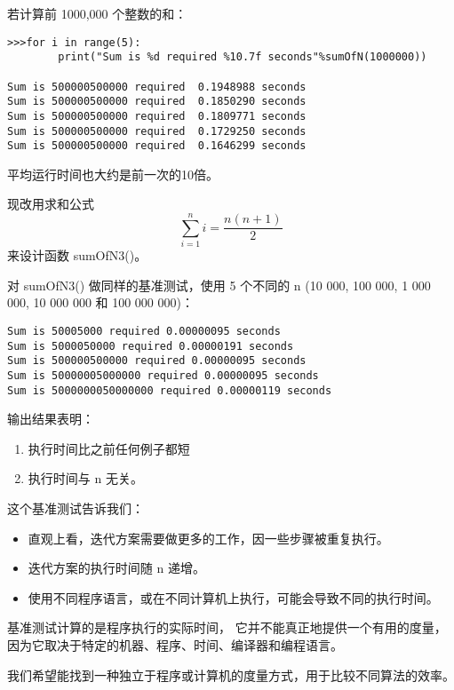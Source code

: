 \begin{frame}[fragile]
若计算前 1000,000 个整数的和：
\begin{lstlisting}
>>>for i in range(5):
        print("Sum is %d required %10.7f seconds"%sumOfN(1000000))

Sum is 500000500000 required  0.1948988 seconds
Sum is 500000500000 required  0.1850290 seconds
Sum is 500000500000 required  0.1809771 seconds
Sum is 500000500000 required  0.1729250 seconds
Sum is 500000500000 required  0.1646299 seconds
\end{lstlisting}
平均运行时间也大约是前一次的10倍。
\end{frame}


\begin{frame}[fragile]
现改用求和公式
$$
\sum_{i=1}^n i = \frac{n(n+1)}2
$$
来设计函数 sumOfN3()。

\end{frame}


\begin{frame}[fragile]
对 sumOfN3() 做同样的基准测试，使用 5 个不同的 n (10 000, 100 000, 1 000 000, 10 000 000 和 100 000 000)：
\begin{lstlisting}
Sum is 50005000 required 0.00000095 seconds
Sum is 5000050000 required 0.00000191 seconds
Sum is 500000500000 required 0.00000095 seconds
Sum is 50000005000000 required 0.00000095 seconds
Sum is 5000000050000000 required 0.00000119 seconds
\end{lstlisting}

\pause
输出结果表明：
\begin{enumerate}
\item 执行时间比之前任何例子都短
\item 执行时间与 n 无关。
\end{enumerate}
\end{frame}


\begin{frame}[fragile]
  这个基准测试告诉我们：
\begin{itemize}
\item 直观上看，迭代方案需要做更多的工作，因一些步骤被重复执行。
\item 迭代方案的执行时间随 n 递增。
\item 使用不同程序语言，或在不同计算机上执行，可能会导致不同的执行时间。
\end{itemize} \pause 
基准测试计算的是程序执行的实际时间， 它并不能真正地提供一个有用的度量，因为它取决于特定的机器、程序、时间、编译器和编程语言。
\pause


我们希望能找到一种独立于程序或计算机的度量方式，用于比较不同算法的效率。
\end{frame}
